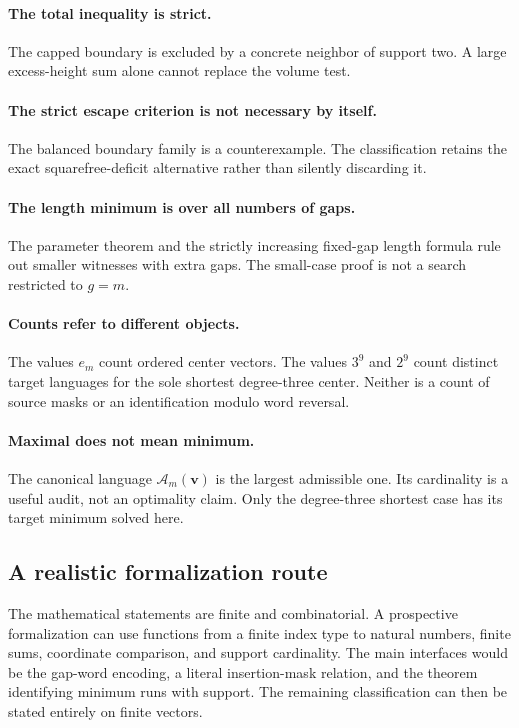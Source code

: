\documentclass[11pt,letterpaper]{article}
\theoremstyle{definition}\newtheorem{definition}[theorem]{Definition}
\theoremstyle{remark}\newtheorem{remark}[theorem]{Remark}
\theoremstyle{definition}\newtheorem{question}[theorem]{Question}
\newcommand{\Adm}[1]{\mathcal A_m(#1)}
\begin{document}
\paragraph{The total inequality is strict.}
The capped boundary is excluded by a concrete neighbor of support two.
A large excess-height sum alone cannot replace the volume test.

\paragraph{The strict escape criterion is not necessary by itself.}
The balanced boundary family is a counterexample. The classification retains
the exact squarefree-deficit alternative rather than silently discarding it.

\paragraph{The length minimum is over all numbers of gaps.}
The parameter theorem and the strictly increasing fixed-gap length formula
rule out smaller witnesses with extra gaps. The small-case proof is not a
search restricted to $g=m$.

\paragraph{Counts refer to different objects.}
The values $e_m$ count ordered center vectors. The values $3^9$ and $2^9$
count distinct target languages for the sole shortest degree-three center.
Neither is a count of source masks or an identification modulo word reversal.

\paragraph{Maximal does not mean minimum.}
The canonical language $\Adm{\mathbf v}$ is the largest admissible one. Its
cardinality is a useful audit, not an optimality claim. Only the degree-three
shortest case has its target minimum solved here.

\subsection{A realistic formalization route}
The mathematical statements are finite and combinatorial. A prospective
formalization can use functions from a finite index type to natural numbers,
finite sums, coordinate comparison, and support cardinality. The main
interfaces would be the gap-word encoding, a literal insertion-mask relation,
and the theorem identifying minimum runs with support. The remaining
classification can then be stated entirely on finite vectors.
\end{document}
